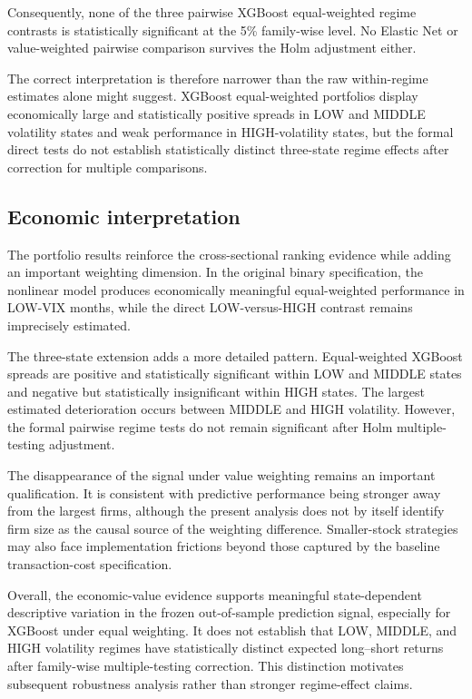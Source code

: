 Consequently, none of the three pairwise XGBoost equal-weighted regime contrasts is statistically significant at the 5\% family-wise level. No Elastic Net or value-weighted pairwise comparison survives the Holm adjustment either.

The correct interpretation is therefore narrower than the raw within-regime estimates alone might suggest. XGBoost equal-weighted portfolios display economically large and statistically positive spreads in LOW and MIDDLE volatility states and weak performance in HIGH-volatility states, but the formal direct tests do not establish statistically distinct three-state regime effects after correction for multiple comparisons.

\subsection{Economic interpretation}

The portfolio results reinforce the cross-sectional ranking evidence while adding an important weighting dimension. In the original binary specification, the nonlinear model produces economically meaningful equal-weighted performance in LOW-VIX months, while the direct LOW-versus-HIGH contrast remains imprecisely estimated.

The three-state extension adds a more detailed pattern. Equal-weighted XGBoost spreads are positive and statistically significant within LOW and MIDDLE states and negative but statistically insignificant within HIGH states. The largest estimated deterioration occurs between MIDDLE and HIGH volatility. However, the formal pairwise regime tests do not remain significant after Holm multiple-testing adjustment.

The disappearance of the signal under value weighting remains an important qualification. It is consistent with predictive performance being stronger away from the largest firms, although the present analysis does not by itself identify firm size as the causal source of the weighting difference. Smaller-stock strategies may also face implementation frictions beyond those captured by the baseline transaction-cost specification.

Overall, the economic-value evidence supports meaningful state-dependent descriptive variation in the frozen out-of-sample prediction signal, especially for XGBoost under equal weighting. It does not establish that LOW, MIDDLE, and HIGH volatility regimes have statistically distinct expected long--short returns after family-wise multiple-testing correction. This distinction motivates subsequent robustness analysis rather than stronger regime-effect claims.

